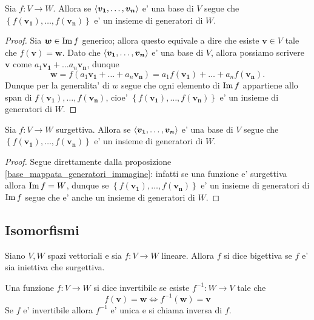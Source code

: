 \begin{proposition}\label{base_mappata_generatori_immagine}
    Sia $f : V \to W$. Allora se $\left\langle \bm{v_1}, \dots, \bm{v_n} \right\rangle$ e' una base di $V$ segue che $\left\{ f(\bm{v_1}), \dots, f(\bm{v_n})\right\}$ e' un insieme di generatori di $W$.
\end{proposition}
\begin{proof}
    Sia $\bm{w} \in \operatorname{Im}f$ generico; allora questo equivale a dire che esiste $\bm{v} \in V$ tale che $f(\bm{v}) = \bm{w}$.
    Dato che $\left\langle \bm{v_1}, \dots, \bm{v_n} \right\rangle$ e' una base di $V$, allora possiamo scrivere $\bm{v}$ come $a_1\bm{v_1} + \dots a_n\bm{v_n}$, dunque 
    \begin{equation*}
        \bm{w} = f(a_1\bm{v_1} + \dots + a_n\bm{v_n}) = a_1f(\bm{v_1}) + \dots + a_nf(\bm{v_n}).
    \end{equation*}
    Dunque per la generalita' di $w$ segue che ogni elemento di $\operatorname{Im}f$ appartiene allo span di $f(\bm{v_1}), \dots, f(\bm{v_n})$, cioe' $\left\{ f(\bm{v_1}), \dots, f(\bm{v_n})\right\}$ e' un insieme di generatori di $W$.
\end{proof}

\begin{corollary}\label{base_mappata_generatori_codominio}
    Sia $f : V \to W$ surgettiva. Allora se $\left\langle \bm{v_1}, \dots, \bm{v_n} \right\rangle$ e' una base di $V$ segue che $\left\{ f(\bm{v_1}), \dots, f(\bm{v_n})\right\}$ e' un insieme di generatori di $W$.
\end{corollary}
\begin{proof}
    Segue direttamente dalla proposizione \ref{base_mappata_generatori_immagine}: infatti se una funzione e' surgettiva allora $\operatorname{Im}f = W$, dunque se $\left\{ f(\bm{v_1}), \dots, f(\bm{v_n})\right\}$ e' un insieme di generatori di $\operatorname{Im}f$ segue che e' anche un insieme di generatori di $W$.
\end{proof}

\subsection{Isomorfismi}

\begin{definition}
    Siano $V, W$ spazi vettoriali e sia $f : V \to W$ lineare. Allora $f$ si dice bigettiva se $f$ e' sia iniettiva che surgettiva.
\end{definition}

\begin{definition}
    Una funzione $f : V \to W$ si dice invertibile se esiste $f^{-1} : W \to V$ tale che \begin{equation}
        f(\bm{v}) = \bm{w} \iff f^{-1}(\bm{w}) = \bm{v}
    \end{equation}
    Se $f$ e' invertibile allora $f^{-1}$ e' unica e si chiama inversa di $f$.
\end{definition}


